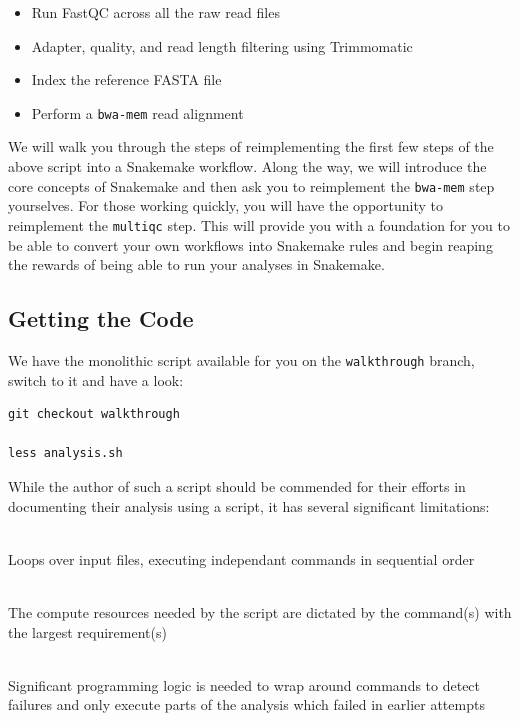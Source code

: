 \begin{itemize}
  \item Run FastQC across all the raw read files
  \item Adapter, quality, and read length filtering using Trimmomatic
  \item Index the reference FASTA file
  \item Perform a \texttt{bwa-mem} read alignment
\end{itemize}

We will walk you through the steps of reimplementing the first few steps of the above script into a Snakemake workflow. Along the way,
we will introduce the core concepts of Snakemake and then ask you to reimplement the \texttt{bwa-mem} step yourselves. For those
working quickly, you will have the opportunity to reimplement the \texttt{multiqc} step. This will provide you with a foundation
for you to be able to convert your own workflows into Snakemake rules and begin reaping the rewards of being able to run your analyses
in Snakemake.

\subsection{Getting the Code}

We have the monolithic script available for you on the \texttt{walkthrough} branch, switch to it and have a look:

\begin{lstlisting}
git checkout walkthrough

less analysis.sh
\end{lstlisting}

While the author of such a script should be commended for their efforts in documenting their analysis using a script,
it has several significant limitations:

\begin{description}[style=multiline,labelindent=0cm,align=left,leftmargin=0.5cm]
  \item[Not parallelised]\hfill\\
    Loops over input files, executing independant commands in sequential order
  \item[Resources over-specified]\hfill\\
    The compute resources needed by the script are dictated by the command(s) with the largest requirement(s)
  \item[Not idempotent]\hfill\\
    Significant programming logic is needed to wrap around commands to detect failures and only execute parts of the analysis which failed in earlier attempts
\end{description}

